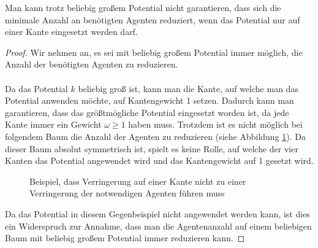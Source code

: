 \begin{theorem}
	Man kann trotz beliebig großem Potential nicht garantieren, dass sich die minimale Anzahl an benötigten Agenten reduziert, wenn das Potential nur auf einer Kante eingesetzt werden darf.
\end{theorem}

\begin{proof}
	Wir nehmen an, es sei mit beliebig großem Potential immer möglich, die Anzahl der benötigten Agenten zu reduzieren.
	\\
	\\	
	Da das Potential $k$ beliebig groß ist, kann man die Kante, auf welche man das Potential anwenden möchte, auf Kantengewicht 1 setzen. Dadurch kann man garantieren, dass das größtmögliche Potential eingesetzt worden ist, da jede Kante immer ein Gewicht $\omega \geq 1$ haben muss. Trotzdem ist es nicht möglich bei folgendem Baum die Anzahl der Agenten zu reduzieren (siehe Abbildung \ref{abb_gegenbeispielMaxPotential}). Da dieser Baum absolut symmetrisch ist, spielt es keine Rolle, auf welche der vier Kanten das Potential angewendet wird und das Kantengewicht auf 1 gesetzt wird.
	
	\begin{figure}[hbt]
		
		\captionsetup{width=0.9\textwidth}
		\caption{Beispiel, dass Verringerung auf einer Kante nicht zu einer Verringerung der notwendigen Agenten führen muss} 
		\label{abb_gegenbeispielMaxPotential}
	\end{figure} 
	
	Da das Potential in diesem Gegenbeispiel nicht angewendet werden kann, ist dies ein Widerspruch zur Annahme, dass man die Agentenanzahl auf einem beliebigen Baum mit beliebig großem Potential immer reduzieren kann.
\end{proof}

